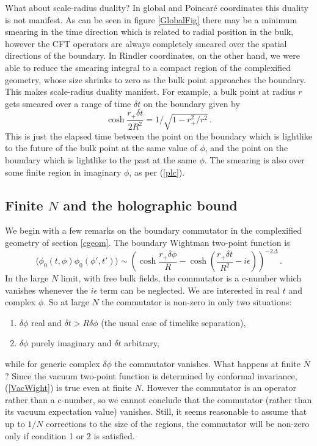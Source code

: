 \documentclass[12pt]{article}
\begin{document}
What about scale-radius duality? In global and Poincar\'e coordinates
this duality is not manifest.  As can be seen in figure
\ref{GlobalFig} there may be a minimum smearing in the
time direction which is related to radial position in the bulk,
however the CFT operators are always completely smeared over the
spatial directions of the boundary.  In Rindler coordinates, on the other hand, we were
able to reduce the smearing integral to a compact region of the
complexified geometry, whose size shrinks to zero as the bulk point
approaches the boundary.  This makes scale-radius duality manifest.
For example, a bulk point at radius $r$ gets smeared over a range of
time $\delta t$ on the boundary given by
\begin{equation}
\cosh \frac{r_+ \delta t}{2R^2} = 1/\sqrt{1-r_{+}^{2}/r^{2}}\,.
\end{equation}
This is just the elapsed time between the point on the boundary which is
lightlike to the future of the bulk point at the same value of $\phi$,
and the point on the boundary which is lightlike to the past at the
same $\phi$. The smearing is also over some finite region in imaginary
$\phi$, as per (\ref{plc}). 

\subsection{Finite $N$ and the holographic bound}

We begin with a few remarks on the boundary commutator in the complexified
geometry of section \ref{cgeom}.  The boundary Wightman two-point
function is
\begin{equation}
\label{VacWight}
\langle \phi_0(t,\phi)\phi_0(\phi',t') \rangle \sim \left(\cosh \frac{r_+ \delta \phi}{R}-
\cosh\left(\frac{r_+\delta t}{R^2} - i\epsilon \right)\right)^{-2\Delta}\,.
\end{equation}
In the large $N$ limit, with free bulk fields,
the commutator is a c-number which vanishes whenever the $i\epsilon$ term can be
neglected.  We are interested
in real $t$ and complex $\phi$.  So at large $N$ the commutator is non-zero
in only two situations:
\begin{enumerate}
\item $\delta \phi$ real and $\delta t > R \delta \phi$ (the usual case of timelike separation),
\item $\delta \phi$ purely imaginary and $\delta t$ arbitrary,
\end{enumerate}
while for generic complex $\delta \phi$ the commutator vanishes. What
happens at finite $N$?  Since the vacuum two-point function is
determined by conformal invariance, (\ref{VacWight}) is true even at
finite $N$.  However the commutator is an operator rather than a
c-number, so we cannot conclude that the commutator (rather than its
vacuum expectation value) vanishes.  Still, it seems reasonable to
assume that up to $1/N$ corrections to the size of the regions, the
commutator will be non-zero only if condition 1 or 2 is satisfied.
  
\end{document}
